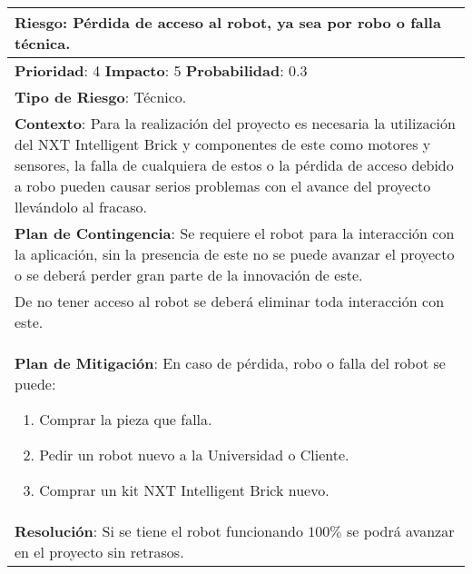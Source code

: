 \begin{table}[H]
  \centering
  \begin{tabular}{|p{15cm}|}\hline
    {\bf Riesgo}: Pérdida de acceso al robot, ya sea por robo o falla técnica.\\\hline
    {\bf Prioridad}: 4  {\bf Impacto}: 5  {\bf Probabilidad}: 0.3\\\hline
    {\bf Tipo de Riesgo}: Técnico.\\\hline
    {\bf Contexto}: Para la realización del proyecto es necesaria la utilización del NXT Intelligent Brick y componentes de este como motores y sensores, la falla de cualquiera de estos o la pérdida de acceso debido a robo pueden causar serios problemas con el avance del proyecto llevándolo al fracaso.\\\hline
    {\bf Plan de Contingencia}: Se requiere el robot para la interacción con la aplicación, sin la presencia de este no se puede avanzar el proyecto o se deberá perder gran parte de la innovación de este.\\De no tener acceso al robot se deberá eliminar toda interacción con este.\\\hline
    {\bf Plan de Mitigación}: En caso de pérdida, robo o falla del robot se puede:\begin{enumerate}\item Comprar la pieza que falla.\item Pedir un robot nuevo a la Universidad o Cliente.\item Comprar un kit NXT Intelligent Brick nuevo.\end{enumerate}\\\hline
    {\bf Resolución}: Si se tiene el robot funcionando $100\%$ se podrá avanzar en el proyecto sin retrasos.\\\hline
  \end{tabular}
  \label{table:R4}
\end{table}


